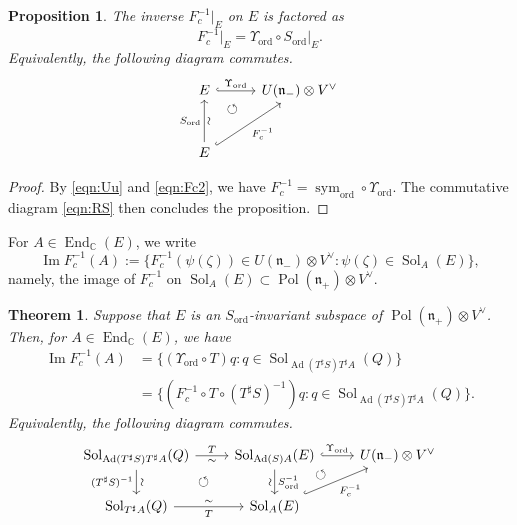 \documentclass[a4paper,11pt,reqno]{amsart}
\newcommand{\frakn}{\mathfrak{n}}
\newcommand{\0}{{\bf 0}}
\newcommand{\C}{\mathbb{C}}
\newcommand{\1}{{\bf 1}}
\DeclareMathOperator{\Ad}{Ad}
\DeclareMathOperator{\End}{End}
\DeclareMathOperator{\Pol}{Pol}
\renewcommand\Im{\operatorname{Im}}
\newcommand{\ord}{{\mathrm{ord}}}
\DeclareMathOperator{\Sol}{Sol}
\DeclareMathOperator{\sym}{sym}
\theoremstyle{plain}
\newtheorem{theorem}[equation]{Theorem}
\newtheorem{proposition}[equation]{Proposition}
\theoremstyle{definition}
\numberwithin{equation}{section}
\theoremstyle{definition}
\begin{document}
\begin{proposition}\label{prop:FcU}
The inverse $F_c^{-1}\vert_{E}$ on $E$ is factored as 
\begin{equation*}
F_c^{-1}\vert_{E} = \Upsilon_{\ord}  \circ S_\ord\vert_{E}.
\end{equation*}
Equivalently, the following diagram commutes.
\begin{equation}\label{eqn:diagram2}
\begin{tikzcd}[row sep=1cm, column sep=1cm]
E
\arrow[r, "\Upsilon_{\ord}", hook]
&
U(\frakn_-)\otimes V^\vee
\\
E
\arrow[u, "S_\ord","\sim"' sloped]
\arrow[ur, "F_c^{-1}"', hook]
&
\arrow[ul, pos=0.8, phantom, "\circlearrowleft"]
\end{tikzcd}
\end{equation}
\end{proposition}

\begin{proof}
By \eqref{eqn:Uu} and \eqref{eqn:Fc2},
we have $F_c^{-1} = \sym_{\ord} \circ \Upsilon_{\ord}$.
The commutative diagram \eqref{eqn:RS} then concludes the proposition.
\end{proof}

For $A \in \End_\C(E)$, we  write 
\begin{equation*}
\Im F_c^{-1}(A):=\{F_c^{-1}(\psi(\zeta)) \in U(\frakn_-)\otimes V^\vee: 
\psi(\zeta) \in \Sol_A(E)\},
\end{equation*}
namely, the image of $F_c^{-1}$ 
on $\Sol_A(E) \subset \Pol(\frakn_+)\otimes V^\vee$.

\begin{theorem}\label{thm:ImFc2}
Suppose that $E$ is an 
$S_{\ord}$-invariant subspace of $\Pol(\frakn_+)\otimes V^\vee$.
Then, for  $A \in \End_\C(E)$, we have
\begin{align*}
\Im F_c^{-1}(A)
&=\{(\Upsilon_{\ord} \circ T)q
: q \in \Sol_{\Ad(T^\sharp S)T^\sharp A }(Q)\}\\[3pt]
&=\{(F_c^{-1}\circ T \circ (T^\sharp S)^{-1})q : 
q \in \Sol_{\Ad(T^\sharp S)T^\sharp A }(Q)\}.
\end{align*}
Equivalently, the following diagram commutes.
\begin{equation}\label{eqn:SolSolU}
\begin{tikzcd}
	{\Sol_{\Ad(T^\sharp S)T^\sharp A }(Q)} & 
	{\Sol_{\Ad(S)A}(E)} 	\arrow[dl, pos=0.5, phantom, "\circlearrowleft"]
	&{U(\frakn_-)\otimes V^\vee} \\
	{\Sol_{T^\sharp A}(Q)} & {\Sol_{A}(E)} &
	\arrow[ul, pos=0.85, phantom, "\circlearrowleft"]
	\arrow[r, "\Upsilon_{\ord}", hook, from=1-2, to=1-3]
	\arrow["F_c^{-1}"', hook, from=2-2, to=1-3]
	\arrow["{T}", "\sim"' , from=1-1, to=1-2]
	\arrow["\sim" sloped, "(T^\sharp S)^{-1}"', from=1-1, to=2-1]
	\arrow["S^{-1}_{\ord}", "\sim"' sloped,  from=1-2, to=2-2]
	\arrow["\sim" , "{T}"',  from=2-1, to=2-2]
\end{tikzcd}
\end{equation}
\end{theorem}
\end{document}
